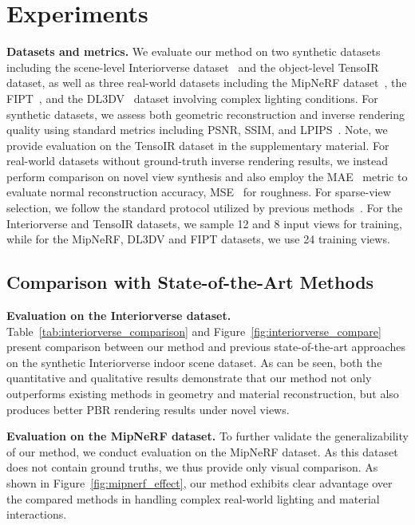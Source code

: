 

\section{Experiments}




\noindent \textbf{Datasets and metrics.}
We evaluate our method on two synthetic datasets including the scene-level Interiorverse dataset~\cite{zhu2022learning} and the object-level TensoIR~\cite{jin2023tensoir} dataset, as well as three real-world datasets including the MipNeRF dataset~\cite{barron2022mip}, the FIPT~\cite{wu2023factorized}, and the DL3DV~\cite{ling2024dl3dv} dataset involving complex lighting conditions. For synthetic datasets, we assess both geometric reconstruction and inverse rendering quality using standard metrics including PSNR, SSIM, and LPIPS~\cite{zhang2018unreasonable}. Note, we provide evaluation on the TensoIR dataset in the supplementary material. For real-world datasets without ground-truth inverse rendering results, we instead perform comparison on novel view synthesis and also employ the MAE~\cite{bae2024rethinking} metric to evaluate normal reconstruction accuracy, MSE~\cite{bai2025qwen3} for roughness. For sparse-view selection, we follow the standard protocol utilized by previous methods~\cite{liao2025spc,fan2024instantsplat,zhu2024fsgs}. For the Interiorverse and TensoIR datasets, we sample 12 and 8 input views for training, while for the MipNeRF, DL3DV and FIPT datasets, we use 24 training views.





\subsection{Comparison with State-of-the-Art Methods}

\noindent\textbf{Evaluation on the Interiorverse dataset.}  
Table~\ref{tab:interiorverse_comparison} and Figure~\ref{fig:interiorverse_compare} present comparison between our method and previous state-of-the-art approaches on the synthetic Interiorverse indoor scene dataset. As can be seen, both the quantitative and qualitative results demonstrate that our method not only outperforms existing methods in geometry and material reconstruction, but also produces better PBR rendering results under novel views.


\vspace{0.5em}
\noindent\textbf{Evaluation on the MipNeRF dataset.}
To further validate the generalizability of our method, we conduct evaluation on the MipNeRF dataset. As this dataset does not contain ground truths, we thus provide only visual comparison. As shown in Figure~\ref{fig:mipnerf_effect}, our method exhibits clear advantage over the compared methods in handling complex real-world lighting and material interactions.

